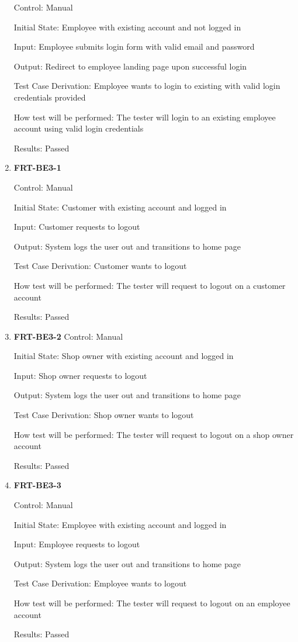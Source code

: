 \documentclass[12pt, titlepage]{article}
\begin{document}
\begin{enumerate}
	      Control: Manual

	      Initial State: Employee with existing account and not logged in

	      Input: Employee submits login form with valid email and password

	      Output: Redirect to employee landing page upon successful login

	      Test Case Derivation: Employee wants to login to existing with valid login credentials provided

	      How test will be performed: The tester will login to an existing employee account using valid login
	      credentials

	      Results: Passed

	\item \textbf{FRT-BE3-1}

	      Control: Manual

	      Initial State: Customer with existing account and logged in

	      Input: Customer requests to logout

	      Output: System logs the user out and transitions to home page

	      Test Case Derivation: Customer wants to logout

	      How test will be performed: The tester will request to logout on a customer account

	      Results: Passed

	\item \textbf{FRT-BE3-2}
	      Control: Manual

	      Initial State: Shop owner with existing account and logged in

	      Input: Shop owner requests to logout

	      Output: System logs the user out and transitions to home page

	      Test Case Derivation: Shop owner wants to logout

	      How test will be performed: The tester will request to logout on a shop owner account

	      Results: Passed

	\item \textbf{FRT-BE3-3}

	      Control: Manual

	      Initial State: Employee with existing account and logged in

	      Input: Employee requests to logout

	      Output: System logs the user out and transitions to home page

	      Test Case Derivation: Employee wants to logout

	      How test will be performed: The tester will request to logout on an employee account

	      Results: Passed

\end{enumerate}
\end{document}

